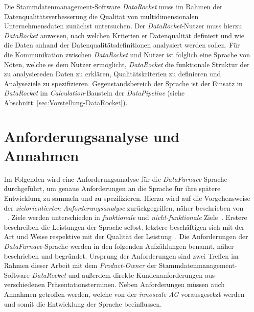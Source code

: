 \documentclass[
  language=german, %
  type=bachelor,%
  ngerman
]{isthesis}
\begin{document}
\begin{content}

  Die Stammdatenmanagement-Software \textit{DataRocket} muss im Rahmen der
  Datenqualitätsver\-besserung die Qualität von multidimensionalen
  Unternehmensdaten zunächst untersuchen. Der \textit{DataRocket}-Nutzer muss
  hierzu \textit{DataRocket} anweisen, nach welchen Kriterien er
  Datenqualität definiert und wie die Daten anhand der
  Datenqualitätsdefinitionen analysiert werden sollen. Für die Kommunikation
  zwischen \textit{DataRocket} und Nutzer ist folglich eine Sprache von Nöten,
  welche es dem Nutzer ermöglicht, \textit{DataRocket} die funktionale Struktur
  der zu analysiereden Daten zu erklären, Qualitätskriterien zu definieren und
  Analyseziele zu spezifizieren.  Gegenstandsbe\-reich der Sprache ist der
  Einsatz in \textit{DataRocket} im \textit{Calculation}-Baustein der
  \textit{DataPipeline} (siehe Abschnitt~\ref{sec:Vorstellung-DataRocket}).


  \section{Anforderungsanalyse und Annahmen}\label{sec:sprache/anforderungsanalyse}

  Im Folgenden wird eine Anforderungsanalyse für die
  \textit{DataFurnace}-Sprache durchgeführt, um genaue Anforderungen an die
  Sprache für ihre spätere Entwicklung zu sammeln und zu spezifizieren.
  Hierzu wird auf die Vorgehensweise der \textit{zielorientierten
  Anforderungsanalyse} zurückgegriffen, näher beschrieben von
  \textsc{\citeauthor{van2001goal}}~\citeyearpar{van2001goal}.  Ziele werden
  unterschieden in \textit{funktionale} und \textit{nicht-funktionale}
  Ziele~\cite[][S.  36]{mylopoulos1999object}.  Erstere beschreiben die
  Leistungen der Sprache selbst, letztere beschäftigen sich mit der Art und
  Weise respektive mit der Qualität der Leistung~\cite[][S.  250]{van2001goal}.
  Die Anforderungen der \textit{DataFurnace}-Sprache werden in den folgenden
  Aufzählungen benannt, näher beschrieben und begründet. Ursprung der
  Anforderungen sind zwei Treffen im Rahmen dieser Arbeit mit dem
  \textit{Product-Owner} der Stammdatenmanagement-Software \textit{DataRocket}
  und außerdem direkte Kundenanforderungen aus verschiedenen
  Präsentationsterminen.  Neben Anforderungen müssen auch Annahmen
  getroffen werden, welche von der \textit{innoscale AG} vorausgesetzt werden
  und somit die Entwicklung der Sprache beeinflussen.



\end{content}
\end{document}
